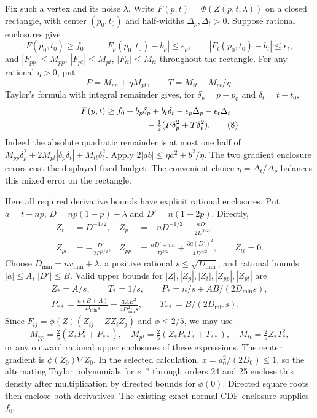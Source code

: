 \documentclass[11pt,a4paper]{article}
\begin{document}
Fix such a vertex and its noise $\lambda$. Write
$F(p,t)=\Phi(Z(p,t,\lambda))$ on a closed rectangle, with center
$(p_0,t_0)$ and half-widths $\Delta_p,\Delta_t>0$.
Suppose rational enclosures give
\[
 F(p_0,t_0)\ge f_0,\qquad
 |F_p(p_0,t_0)-b_p|\le\epsilon_p,\qquad
 |F_t(p_0,t_0)-b_t|\le\epsilon_t,
\]
and $|F_{pp}|\le M_{pp}$, $|F_{pt}|\le M_{pt}$,
$|F_{tt}|\le M_{tt}$ throughout the rectangle.
For any rational $\eta>0$, put
\[
 P=M_{pp}+\eta M_{pt},\qquad T=M_{tt}+M_{pt}/\eta.
\]
Taylor's formula with integral remainder gives, for
$\delta_p=p-p_0$ and $\delta_t=t-t_0$,
\begin{align*}
 F(p,t)\ge{}& f_0+b_p\delta_p+b_t\delta_t
 -\epsilon_p\Delta_p-\epsilon_t\Delta_t\\
 &\hspace{12mm}-\tfrac12(P\delta_p^2+T\delta_t^2).
 \tag{8}
\end{align*}
Indeed the absolute quadratic remainder is at most one half of
$M_{pp}\delta_p^2+2M_{pt}|\delta_p\delta_t|+M_{tt}\delta_t^2$.
Apply $2|ab|\le\eta a^2+b^2/\eta$. The two gradient enclosure
errors cost the displayed fixed budget. The convenient choice
$\eta=\Delta_t/\Delta_p$ balances this mixed error on the rectangle.

Here all required derivative bounds have explicit rational enclosures.
Put $a=t-np$, $D=np(1-p)+\lambda$ and $D'=n(1-2p)$. Directly,
\begin{align*}
 Z_t&=D^{-1/2},&
 Z_p&=-nD^{-1/2}-\frac{aD'}{2D^{3/2}},\\
 Z_{pt}&=-\frac{D'}{2D^{3/2}},&
 Z_{pp}&=\frac{nD'+na}{D^{3/2}}
                    +\frac{3a(D')^2}{4D^{5/2}},\qquad Z_{tt}=0.
\end{align*}
Choose $D_{\min}=nv_{\min}+\lambda$, a positive rational
$s\le\sqrt{D_{\min}}$, and rational bounds $|a|\le A$, $|D'|\le B$.
Valid upper bounds for $|Z|,|Z_p|,|Z_t|,|Z_{pp}|,|Z_{pt}|$ are
\begin{gather*}
 Z_*=A/s,\qquad T_*=1/s,\qquad
 P_*=n/s+AB/(2D_{\min}s),\\
 P_{**}=\frac{n(B+A)}{D_{\min}s}
             +\frac{3AB^2}{4D_{\min}^2s},\qquad
 T_{**}=B/(2D_{\min}s).
\end{gather*}
Since $F_{ij}=\phi(Z)(Z_{ij}-ZZ_iZ_j)$ and $\phi\le2/5$, we may use
\[
 M_{pp}=\tfrac25(Z_*P_*^2+P_{**}),\quad
 M_{pt}=\tfrac25(Z_*P_*T_*+T_{**}),\quad
 M_{tt}=\tfrac25 Z_*T_*^2,
 \tag{9}
\]
or any outward rational upper enclosures of these expressions.
The center gradient is $\phi(Z_0)\nabla Z_0$. In the selected
calculation, $x=a_0^2/(2D_0)\le1$, so the alternating Taylor
polynomials for $e^{-x}$ through orders 24 and 25 enclose this
density after multiplication by directed bounds for $\phi(0)$.
Directed square roots then enclose both derivatives. The existing
exact normal-CDF enclosure supplies $f_0$.
\end{document}
